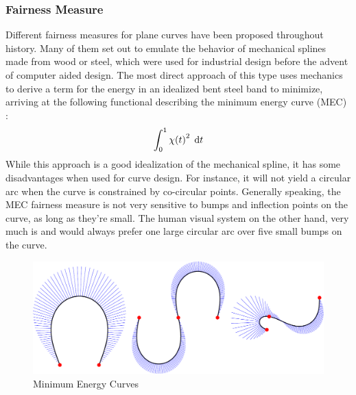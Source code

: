 \documentclass[a4paper]{article}
\begin{document}
			\subsubsection{Fairness Measure}
			\label{section:fairness_measure}


				Different fairness measures for plane curves have been proposed throughout history. Many of them set out to emulate the behavior of mechanical splines made from wood or steel, which were used for industrial design before the advent of computer aided design. The most direct approach of this type uses mechanics to derive a term for the energy in an idealized bent steel band to minimize, arriving at the following functional describing the minimum energy curve (MEC) \cite{paper-mec}:
				\begin{equation*}
					\int_{0}^{1} \chi\!\left( t \right)^2 \; \mathrm{d}t
				\end{equation*}
				While this approach is a good idealization of the mechanical spline, it has some disadvantages when used for curve design. For instance, it will not yield a circular arc when the curve is constrained by co-circular points. Generally speaking, the MEC fairness measure is not very sensitive to bumps and inflection points on the curve, as long as they're small. The human visual system on the other hand, very much is and would always prefer one large circular arc over five small bumps on the curve.

				\begin{figure}[htbp]
					\centering
					\includegraphics[width=\textwidth]{content/output/fairness_mec.pdf}
					\caption{Minimum Energy Curves}
					\label{figure:minimum_energy_curves}
				\end{figure}
\end{document}
